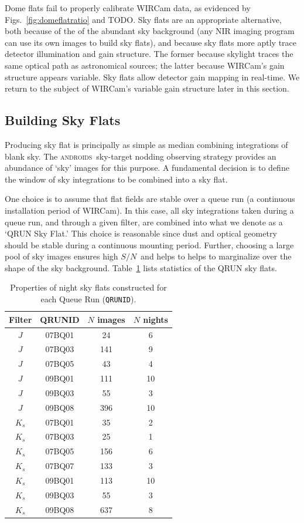 \documentclass[iop]{emulateapj}
\newcommand{\sn}{\ensuremath{S/N}} %
\newcommand{\androids}{\textsc{androids}}
\newcommand{\todo}[1]{\textcolor{RedOrange}{#1}} %
\begin{document}
Dome flats fail to properly calibrate WIRCam data, as evidenced by Figs.~\ref{fig:domeflatratio} and \todo{TODO}.
Sky flats are an appropriate alternative, both because of the of the abundant sky background (any NIR imaging program can use its own images to build sky flats), and because sky flats more aptly trace detector illumination and gain structure.
The former because skylight traces the same optical path as astronomical sources; the latter because WIRCam's gain structure appears variable.
Sky flats allow detector gain mapping in real-time.
We return to the subject of WIRCam's variable gain structure later in this section.

\subsection{Building Sky Flats}
\label{sec:flatbuilding}

Producing sky flat is principally as simple as median combining integrations of blank sky. 
The \androids\ sky-target nodding observing strategy provides an abundance of `sky' images for this purpose.
A fundamental decision is to define the window of sky integrations to be combined into a sky flat.

One choice is to assume that flat fields are stable over a queue run (a continuous installation period of WIRCam).
In this case, all sky integrations taken during a queue run, and through a given filter, are combined into what we denote as a `QRUN Sky Flat.'
This choice is reasonable since dust and optical geometry should be stable during a continuous mounting period.
Further, choosing a large pool of sky images ensures high \sn\, and helps to helps to marginalize over the shape of the sky background.
Table~\ref{tab:flattable} lists statistics of the QRUN sky flats.

\begin{table}[t]
\centering
\caption{Properties of night sky flats constructed for each Queue Run (\texttt{QRUNID}).}
\label{tab:flattable}

\begin{tabular}{cccc}
\hline
Filter & QRUNID & $N$ images & $N$ nights \\
\hline
$J$ & 07BQ01 & 24 & 6 \\
$J$ & 07BQ03 & 141 & 9 \\
$J$ & 07BQ05 & 43 & 4 \\
$J$ & 09BQ01 & 111 & 10 \\
$J$ & 09BQ03 & 55 & 3 \\
$J$ & 09BQ08 & 396 & 10 \\
\hline
$K_s$ & 07BQ01 & 35 & 2 \\
$K_s$ & 07BQ03 & 25 & 1 \\
$K_s$ & 07BQ05 & 156 & 6 \\
$K_s$ & 07BQ07 & 133 & 3 \\
$K_s$ & 09BQ01 & 113 & 10 \\
$K_s$ & 09BQ03 & 55 & 3 \\
$K_s$ & 09BQ08 & 637 & 8 \\
\hline
\end{tabular}
\end{table}
\end{document}
